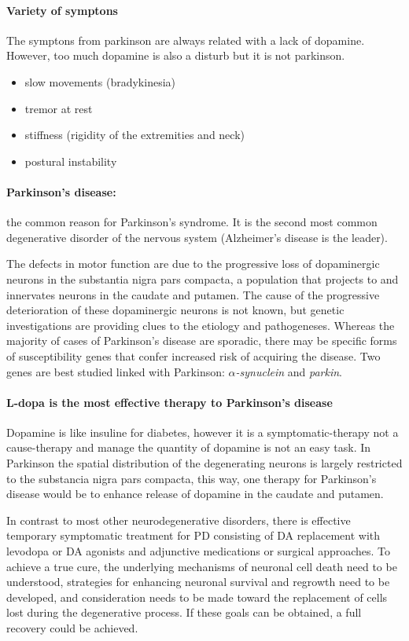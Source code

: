 \documentclass[12pt,article,oneside,a4paper]{memoir}
\begin{document}
\paragraph{Variety of symptons}
The symptons from parkinson are always related with a lack of dopamine. However, too much dopamine is also a disturb but it is not parkinson.

\begin{itemize}
\item slow movements (bradykinesia)
\item tremor at rest
\item stiffness (rigidity of the extremities and neck)
\item postural instability
\end{itemize}

\paragraph{Parkinson's disease:} the common reason for Parkinson's syndrome. It is the second most common degenerative disorder of the nervous system (Alzheimer's disease is the leader).

The defects in motor function are due to the progressive loss of dopaminergic neurons in the substantia nigra pars compacta, a population that projects to and innervates neurons in the caudate and putamen.
The cause of the progressive deterioration of these dopaminergic neurons is not known, but genetic investigations are providing clues to the etiology and pathogeneses. Whereas the majority of cases of Parkinson’s disease are sporadic, there may be specific forms of susceptibility genes that confer increased risk of acquiring the disease. Two genes are best studied linked with Parkinson: \textit{$\alpha$-synuclein} and \textit{parkin}.

\paragraph{L-dopa is the most effective therapy to Parkinson's disease}
Dopamine is like insuline for diabetes, however it is a symptomatic-therapy not a cause-therapy and manage the quantity of dopamine is not an easy task.
In Parkinson the spatial distribution of the degenerating neurons is largely restricted to the substancia nigra pars compacta, this way, one therapy for Parkinson’s disease would be to enhance release of dopamine in the caudate and putamen.

In contrast to most other neurodegenerative disorders, there is effective temporary symptomatic treatment for PD consisting of DA replacement with levodopa or DA agonists and adjunctive medications or surgical approaches. To achieve a true cure, the underlying mechanisms of neuronal cell death need to be understood, strategies for enhancing neuronal survival and regrowth need to be developed, and consideration needs to be made toward the replacement of cells lost during the degenerative process. If these goals can be obtained, a full recovery could be achieved.
\end{document}
